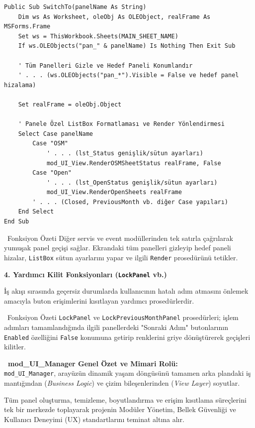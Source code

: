 \begin{lstlisting}[caption={SwitchTo Prosedürü (Özet)}]
Public Sub SwitchTo(panelName As String)
    Dim ws As Worksheet, oleObj As OLEObject, realFrame As MSForms.Frame
    Set ws = ThisWorkbook.Sheets(MAIN_SHEET_NAME)
    If ws.OLEObjects("pan_" & panelName) Is Nothing Then Exit Sub
    
    ' Tüm Panelleri Gizle ve Hedef Paneli Konumlandır
    ' . . . (ws.OLEObjects("pan_*").Visible = False ve hedef panel hizalama)

    Set realFrame = oleObj.Object
    
    ' Panele Özel ListBox Formatlaması ve Render Yönlendirmesi
    Select Case panelName
        Case "OSM"
            ' . . . (lst_Status genişlik/sütun ayarları)
            mod_UI_View.RenderOSMSheetStatus realFrame, False
        Case "Open"
            ' . . . (lst_OpenStatus genişlik/sütun ayarları)
            mod_UI_View.RenderOpenSheets realFrame
        ' . . . (Closed, PreviousMonth vb. diğer Case yapıları)
    End Select
End Sub
\end{lstlisting}

\begin{infobox}{\faCog\ Fonksiyon Özeti}
Diğer servis ve event modüllerinden tek satırla çağrılarak yumuşak panel geçişi sağlar. Ekrandaki tüm panelleri gizleyip hedef paneli hizalar, \texttt{ListBox} sütun ayarlarını yapar ve ilgili \texttt{Render} prosedürünü tetikler.
\end{infobox}

\vspace{0.3cm}

\textbf{\textcolor{primary}{4. Yardımcı Kilit Fonksiyonları (\texttt{LockPanel} vb.)}}

İş akışı sırasında geçersiz durumlarda kullanıcının hatalı adım atmasını önlemek amacıyla buton erişimlerini kısıtlayan yardımcı prosedürlerdir.

\begin{infobox}{\faLock\ Fonksiyon Özeti}
\texttt{LockPanel} ve \texttt{LockPreviousMonthPanel} prosedürleri; işlem adımları tamamlandığında ilgili panellerdeki "Sonraki Adım" butonlarının \texttt{Enabled} özelliğini \texttt{False} konumuna getirip renklerini griye dönüştürerek geçişleri kilitler.
\end{infobox}

\vspace{0.4cm}


\begin{tcolorbox}[colback=yellow!15,colframe=orange!80!black,leftrule=3.5pt,boxrule=0.4pt,top=6pt,bottom=6pt]
    \textbf{\textcolor{orange!80!black}{\faInfoCircle\ mod\_UI\_Manager Genel Özet ve Mimari Rolü:}}\\
    \small \texttt{mod\_UI\_Manager}, arayüzün dinamik yaşam döngüsünü tamamen arka plandaki iş mantığından (\textit{Business Logic}) ve çizim bileşenlerinden (\textit{View Layer}) soyutlar. 
    
    Tüm panel oluşturma, temizleme, boyutlandırma ve erişim kısıtlama süreçlerini tek bir merkezde toplayarak projenin Modüler Yönetim, Bellek Güvenliği ve Kullanıcı Deneyimi (UX) standartlarını teminat altına alır.
\end{tcolorbox}


